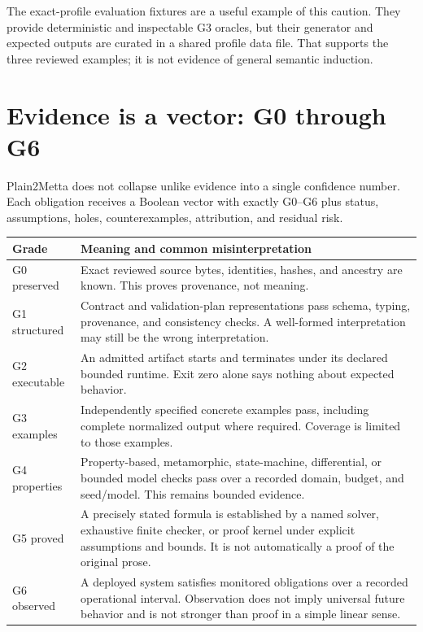 \documentclass[11pt]{article}
\begin{document}
The exact-profile evaluation fixtures are a useful example of this caution.
They provide deterministic and inspectable G3 oracles, but their generator
and expected outputs are curated in a shared profile data file.  That supports
the three reviewed examples; it is not evidence of general semantic induction.

\section{Evidence is a vector: G0 through G6}

Plain2Metta does not collapse unlike evidence into a single confidence number.
Each obligation receives a Boolean vector with exactly G0--G6 plus status,
assumptions, holes, counterexamples, attribution, and residual risk.

\begin{longtable}{@{}p{}p{}@{}}
\toprule
Grade & Meaning and common misinterpretation \\
\midrule
\endhead
G0 preserved & Exact reviewed source bytes, identities, hashes, and ancestry
are known.  This proves provenance, not meaning. \\
G1 structured & Contract and validation-plan representations pass schema,
typing, provenance, and consistency checks.  A well-formed interpretation may
still be the wrong interpretation. \\
G2 executable & An admitted artifact starts and terminates under its declared
bounded runtime.  Exit zero alone says nothing about expected behavior. \\
G3 examples & Independently specified concrete examples pass, including
complete normalized output where required.  Coverage is limited to those
examples. \\
G4 properties & Property-based, metamorphic, state-machine, differential, or
bounded model checks pass over a recorded domain, budget, and seed/model.
This remains bounded evidence. \\
G5 proved & A precisely stated formula is established by a named solver,
exhaustive finite checker, or proof kernel under explicit assumptions and
bounds.  It is not automatically a proof of the original prose. \\
G6 observed & A deployed system satisfies monitored obligations over a
recorded operational interval.  Observation does not imply universal future
behavior and is not stronger than proof in a simple linear sense. \\
\bottomrule
\end{longtable}
\end{document}
